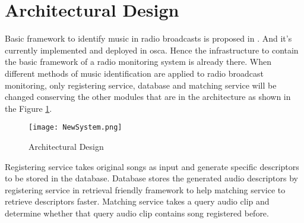 \section{Architectural Design}

Basic framework to identify music in radio broadcasts is proposed in 
\cite{Nishan}. And it's currently
implemented and deployed in \ac{osca}. Hence the infrastructure to contain the basic framework
of a radio monitoring system is already there. When different methods of music identification
are applied to radio broadcast monitoring, only registering service, database and matching service
will be changed conserving the other modules that are in the architecture as shown in the Figure
\ref{fig:new_arch}.

\begin{figure}[H]
    \centering
    \texttt{[image: NewSystem.png]}
    \caption{Architectural Design}
    \label{fig:new_arch}
\end{figure}

Registering service takes original songs as input and generate specific descriptors to be stored
in the database. Database stores the generated audio descriptors by registering service in
retrieval friendly framework to help matching service to retrieve descriptors faster. Matching
service takes a query audio clip and determine whether that query audio clip contains song registered
before.     